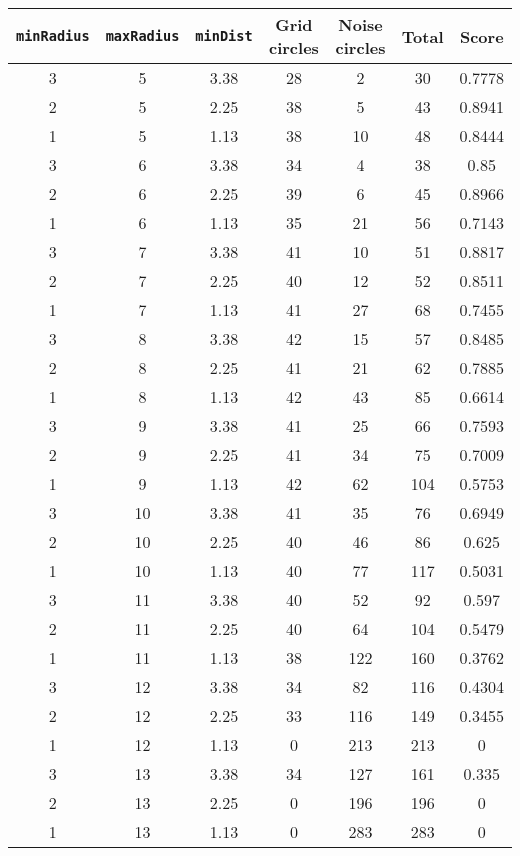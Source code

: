 \documentclass[letterpaper, 12pt]{article}
\begin{document}
\begin{longtable}{|c|c|c|c|c|c|c|}
\hline
\textbf{\texttt{minRadius}} & \textbf{\texttt{maxRadius}} & \textbf{\texttt{minDist}} & \textbf{Grid circles} & \textbf{Noise circles} & \textbf{Total} & \textbf{Score} \\
\hline
3 & 5 & 3.38 & 28 & 2 & 30 & 0.7778 \\
\hline
2 & 5 & 2.25 & 38 & 5 & 43 & 0.8941 \\
\hline
1 & 5 & 1.13 & 38 & 10 & 48 & 0.8444 \\
\hline
3 & 6 & 3.38 & 34 & 4 & 38 & 0.85 \\
\hline
2 & 6 & 2.25 & 39 & 6 & 45 & 0.8966 \\
\hline
1 & 6 & 1.13 & 35 & 21 & 56 & 0.7143 \\
\hline
3 & 7 & 3.38 & 41 & 10 & 51 & 0.8817 \\
\hline
2 & 7 & 2.25 & 40 & 12 & 52 & 0.8511 \\
\hline
1 & 7 & 1.13 & 41 & 27 & 68 & 0.7455 \\
\hline
3 & 8 & 3.38 & 42 & 15 & 57 & 0.8485 \\
\hline
2 & 8 & 2.25 & 41 & 21 & 62 & 0.7885 \\
\hline
1 & 8 & 1.13 & 42 & 43 & 85 & 0.6614 \\
\hline
3 & 9 & 3.38 & 41 & 25 & 66 & 0.7593 \\
\hline
2 & 9 & 2.25 & 41 & 34 & 75 & 0.7009 \\
\hline
1 & 9 & 1.13 & 42 & 62 & 104 & 0.5753 \\
\hline
3 & 10 & 3.38 & 41 & 35 & 76 & 0.6949 \\
\hline
2 & 10 & 2.25 & 40 & 46 & 86 & 0.625 \\
\hline
1 & 10 & 1.13 & 40 & 77 & 117 & 0.5031 \\
\hline
3 & 11 & 3.38 & 40 & 52 & 92 & 0.597 \\
\hline
2 & 11 & 2.25 & 40 & 64 & 104 & 0.5479 \\
\hline
1 & 11 & 1.13 & 38 & 122 & 160 & 0.3762 \\
\hline
3 & 12 & 3.38 & 34 & 82 & 116 & 0.4304 \\
\hline
2 & 12 & 2.25 & 33 & 116 & 149 & 0.3455 \\
\hline
1 & 12 & 1.13 & 0 & 213 & 213 & 0 \\
\hline
3 & 13 & 3.38 & 34 & 127 & 161 & 0.335 \\
\hline
2 & 13 & 2.25 & 0 & 196 & 196 & 0 \\
\hline
1 & 13 & 1.13 & 0 & 283 & 283 & 0 \\

\end{longtable}
\end{document}
